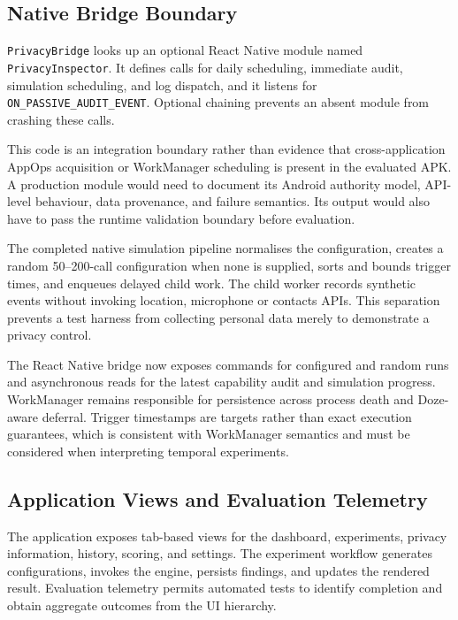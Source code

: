 \subsection{Native Bridge Boundary}

\texttt{PrivacyBridge} looks up an optional React Native module named \texttt{PrivacyInspector}. It defines calls for daily scheduling, immediate audit, simulation scheduling, and log dispatch, and it listens for \texttt{ON\_PASSIVE\_AUDIT\_EVENT}. Optional chaining prevents an absent module from crashing these calls.

This code is an integration boundary rather than evidence that cross-application AppOps acquisition or WorkManager scheduling is present in the evaluated APK. A production module would need to document its Android authority model, API-level behaviour, data provenance, and failure semantics. Its output would also have to pass the runtime validation boundary before evaluation.

The completed native simulation pipeline normalises the configuration, creates a random 50--200-call configuration when none is supplied, sorts and bounds trigger times, and enqueues delayed child work. The child worker records synthetic events without invoking location, microphone or contacts APIs. This separation prevents a test harness from collecting personal data merely to demonstrate a privacy control.

The React Native bridge now exposes commands for configured and random runs and asynchronous reads for the latest capability audit and simulation progress. WorkManager remains responsible for persistence across process death and Doze-aware deferral. Trigger timestamps are targets rather than exact execution guarantees, which is consistent with WorkManager semantics and must be considered when interpreting temporal experiments.

\subsection{Application Views and Evaluation Telemetry}

The application exposes tab-based views for the dashboard, experiments, privacy information, history, scoring, and settings. The experiment workflow generates configurations, invokes the engine, persists findings, and updates the rendered result. Evaluation telemetry permits automated tests to identify completion and obtain aggregate outcomes from the UI hierarchy.


